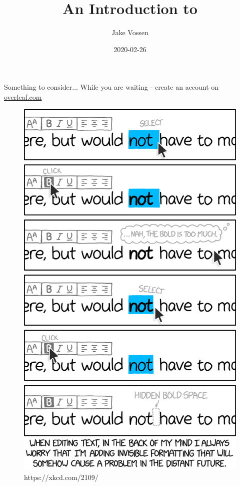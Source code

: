 \documentclass{beamer}
\title{An Introduction to \latex}
\author{Jake Vossen}
\institute{Colorado School of Mines - ACM-W}
\date{2020-02-26}
\begin{document}
\begin{frame}{Something to consider...}
    While you are waiting - create an account on \url{overleaf.com}
    \begin{figure}
    \includegraphics[scale=.13]{invisible_formatting_2x.png}
    \caption{https://xkcd.com/2109/}
  \end{figure}
\end{frame}
\begin{frame}
  \titlepage
\end{frame}

\end{document}
